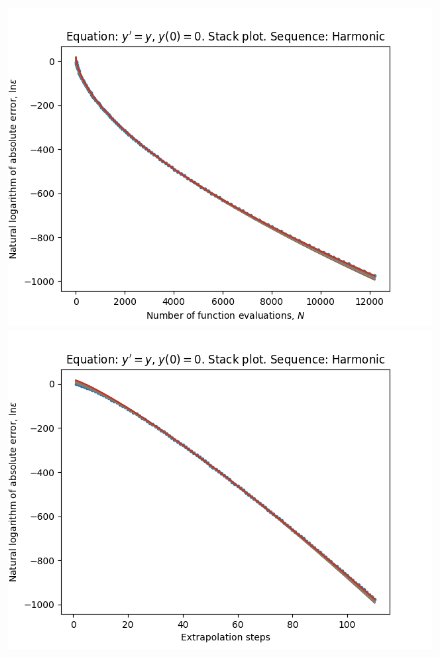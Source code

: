 \begin{figure}[H]
\centering
\begin{minipage}{0.45\textwidth}
\centering
\includegraphics[scale=0.45]{../results/emr_plots/exp_growth_hp_harmonic_stack.png}
\end{minipage}
\begin{minipage}{0.45\textwidth}
\centering
\includegraphics[scale=0.45]{../results/emr_plots/exp_growth_hp_harmonic_steps_stack.png}
\end{minipage}
\end{figure}

